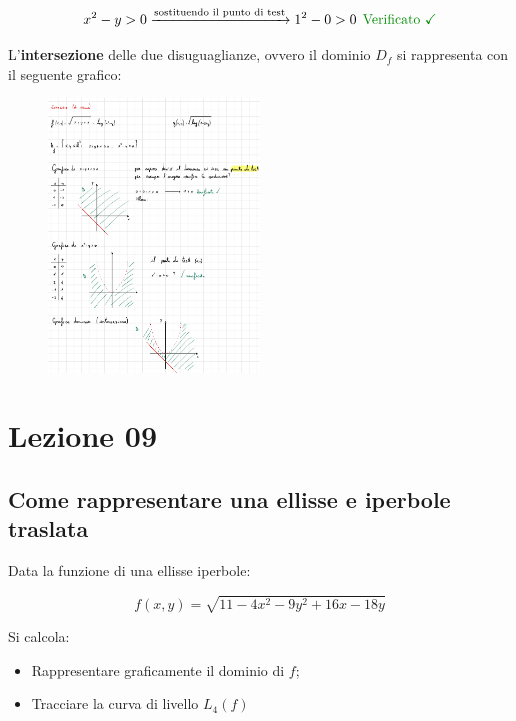 \documentclass[a4paper]{article}
\begin{document}
	\begin{equation*}
		x^{2} - y > 0 \xrightarrow{\text{sostituendo il punto di test}} 1^{2} - 0 > 0 \:\: \textcolor{Green4}{\text{Verificato \checkmark}}
	\end{equation*}

	\noindent
	L'\textbf{intersezione} delle due disuguaglianze, ovvero il dominio $D_{f}$ si rappresenta con il seguente grafico:
	
	\begin{figure}[!htp]
		\centering
		\includegraphics[width=0.5\textwidth]{img/ex1_esame3.pdf}
	\end{figure}

	\newpage
	
	\section{Lezione 09}
	
	\subsection{Come rappresentare una ellisse e iperbole traslata}
	
	Data la funzione di una ellisse iperbole:
	
	\begin{equation*}
		f\left(x,y\right) = \sqrt{11 - 4x^{2} - 9y^{2} + 16x - 18y}
	\end{equation*}
	
	Si calcola:
	
	\begin{itemize}
		\item Rappresentare graficamente il dominio di $f$;
		\item Tracciare la curva di livello $L_{4}\left(f\right)$
	\end{itemize}
\end{document}
